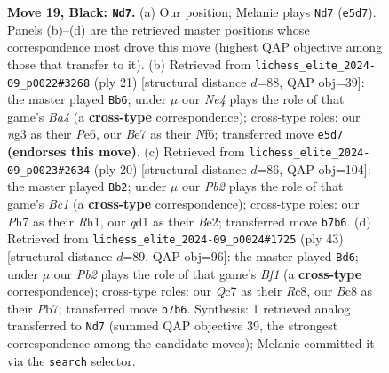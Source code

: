 \documentclass[11pt]{article}
\begin{document}
\begin{figure}[p]
\caption{\textbf{Move 19, Black: \texttt{Nd7}.} (a) Our position; Melanie plays \texttt{Nd7} (\texttt{e5d7}). Panels (b)--(d) are the retrieved master positions whose correspondence most drove this move (highest QAP objective among those that transfer to it). (b) Retrieved from \texttt{lichess\_elite\_2024-09\_p0022\#3268} (ply 21) [structural distance $d$=88, QAP obj=39]: the master played \texttt{Bb6}; under $\mu$ our \emph{Ne4} plays the role of that game's \emph{Ba4} (a \textbf{cross-type} correspondence); cross-type roles: our \emph{n}g3 as their \emph{P}e6, our \emph{B}e7 as their \emph{N}f6; transferred move \texttt{e5d7} \textbf{(endorses this move)}. (c) Retrieved from \texttt{lichess\_elite\_2024-09\_p0023\#2634} (ply 20) [structural distance $d$=86, QAP obj=104]: the master played \texttt{Bb2}; under $\mu$ our \emph{Pb2} plays the role of that game's \emph{Bc1} (a \textbf{cross-type} correspondence); cross-type roles: our \emph{P}h7 as their \emph{R}h1, our \emph{q}d1 as their \emph{B}e2; transferred move \texttt{b7b6}. (d) Retrieved from \texttt{lichess\_elite\_2024-09\_p0024\#1725} (ply 43) [structural distance $d$=89, QAP obj=96]: the master played \texttt{Bd6}; under $\mu$ our \emph{Pb2} plays the role of that game's \emph{Bf1} (a \textbf{cross-type} correspondence); cross-type roles: our \emph{Q}c7 as their \emph{R}c8, our \emph{B}c8 as their \emph{P}b7; transferred move \texttt{b7b6}. Synthesis: 1 retrieved analog transferred to \texttt{Nd7} (summed QAP objective 39, the strongest correspondence among the candidate moves); Melanie committed it via the \texttt{search} selector.}
\label{fig:thought-m37}
\end{figure}

\clearpage
\end{document}
